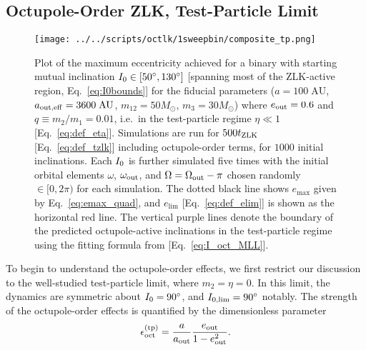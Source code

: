 \documentclass[
        fleqn,
        usenatbib,
    ]{mnras}
\newlength{\colummwidth}
\begin{document}
\subsection{Octupole-Order ZLK, Test-Particle Limit}

\begin{figure}
    \centering
    \texttt{[image: ../../scripts/octlk/1sweepbin/composite\_tp.png]}
    \caption{Plot of the maximum eccentricity achieved for a binary with
    starting mutual inclination $I_{\rm 0} \in [50^\circ, 130^\circ]$ [spanning
    most of the ZLK-active region, Eq.~\eqref{eq:I0bounds}] for the fiducial
    parameters ($a = 100\;\mathrm{AU}$, $a_{\rm out, eff} = 3600\;\mathrm{AU}$,
    $m_{12} = 50M_{\odot}$, $m_3 = 30M_{\odot}$) where $e_{\rm out} = 0.6$ and
    $q \equiv m_2 / m_1 = 0.01$, i.e.\ in the test-particle regime $\eta \ll 1$
    [Eq.~\eqref{eq:def_eta}]. Simulations are run for $500t_{\rm ZLK}$
    [Eq.~\eqref{eq:def_tzlk}] including octupole-order terms, for $1000$ initial
    inclinations. Each $I_{\rm 0}$ is further simulated five times with the
    initial orbital elements $\omega$, $\omega_{\rm out}$, and $\Omega =
    \Omega_{\rm out} - \pi$ chosen randomly $\in [0, 2\pi)$%
    for each simulation. The dotted black line shows $e_{\max}$ given by
    Eq.~\eqref{eq:emax_quad}, and $e_{\lim}$ [Eq.~\eqref{eq:def_elim}] is shown
    as the horizontal red line. The vertical purple lines denote the boundary of
    the predicted octupole-active inclinations in the test-particle regime using
    the fitting formula from \citet{MLL16} [Eq.~\eqref{eq:I_oct_MLL}].
    }\label{fig:composite_tp}
\end{figure}

To begin to understand the octupole-order effects, we first restrict our
discussion to the well-studied test-particle limit, where $m_2 = \eta = 0$.
In this limit, the dynamics are symmetric about $I_{\rm 0} = 90^\circ$, and
$I_{\rm 0, \lim} = 90^\circ$ notably. The strength of the octupole-order effects
is quantified by the dimensionless parameter
\begin{equation}
    \epsilon_{\rm oct}^{\rm (tp)} = \frac{a}{a_{\rm
        out}} \frac{e_{\rm out}}{1 - e_{\rm out}^2}.\label{eq:eps_oct_tp}
\end{equation}
\end{document}
